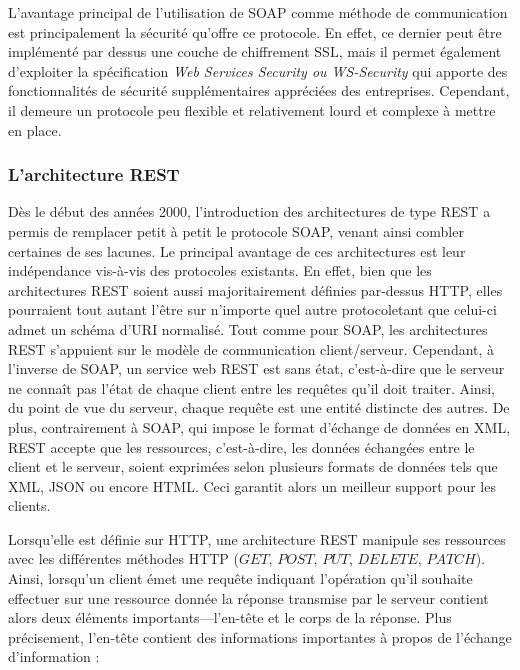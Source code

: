 L'avantage principal de l'utilisation de \ac{SOAP} comme méthode de communication est principalement la sécurité qu'offre ce protocole. En effet, ce dernier peut être implémenté par dessus une couche de chiffrement \ac{SSL}, mais il permet également d'exploiter la spécification \textit{Web Services Security ou WS-Security} qui apporte des fonctionnalités de sécurité supplémentaires appréciées des entreprises. Cependant, il demeure un protocole peu flexible et relativement lourd et complexe à mettre en place.

\subsubsection{L'architecture \ac{REST}}

Dès le début des années 2000, l'introduction des architectures de type \ac{REST} \citep{Fielding2000} a permis de remplacer petit à petit le protocole \ac{SOAP}, venant ainsi combler certaines de ses lacunes. Le principal avantage de ces architectures est leur indépendance vis-à-vis des protocoles existants. En effet, bien que les architectures \ac{REST} soient aussi majoritairement définies par-dessus \ac{HTTP}, elles pourraient tout autant l'être sur n'importe quel autre protocole\textemdash tant que celui-ci admet un schéma d'\ac{URI} normalisé. Tout comme pour \ac{SOAP}, les architectures \ac{REST} s'appuient sur le modèle de communication client/serveur. Cependant, à l'inverse de \ac{SOAP}, un service web \ac{REST} est sans état, c'est-à-dire que le serveur ne connaît pas l'état de chaque client entre les requêtes qu'il doit traiter. Ainsi, du point de vue du serveur, chaque requête est une entité distincte des autres. De plus, contrairement à \ac{SOAP}, qui impose le format d'échange de données en \ac{XML}, \ac{REST} accepte que les ressources, c'est-à-dire, les données échangées entre le client et le serveur, soient exprimées selon plusieurs formats de données tels que \ac{XML}, \ac{JSON} ou encore \ac{HTML}. Ceci garantit alors un meilleur support pour les clients.

Lorsqu'elle est définie sur \ac{HTTP}, une architecture \ac{REST} manipule ses ressources avec les différentes méthodes \ac{HTTP} ($GET$, $POST$, $PUT$, $DELETE$, $PATCH$). Ainsi, lorsqu'un client émet une requête indiquant l'opération qu'il souhaite effectuer sur une ressource donnée la réponse transmise par le serveur contient alors deux éléments importants—l'en-tête et le corps de la réponse. Plus précisement, l'en-tête contient des informations importantes à propos de l’échange d’information :


